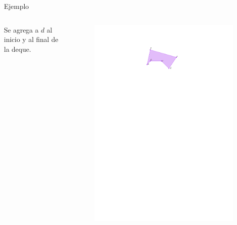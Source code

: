 \documentclass[aspectratio=169,xcolor=dvipsnames, t]{beamer}
\begin{document}
\begin{frame}{Ejemplo}
  \begin{columns}
    \begin{column}{0.5\textwidth}
      Se agrega a $d$ al inicio y al final de la deque.
    \end{column}
    \begin{column}{0.5\textwidth}
      \begin{figure}
        \centering
        \includegraphics[width=\linewidth, height=0.5\textheight, page=7, keepaspectratio]{IPE/Melkman.pdf}
      \end{figure}
    \end{column}
  \end{columns}
\end{frame}
\end{document}
